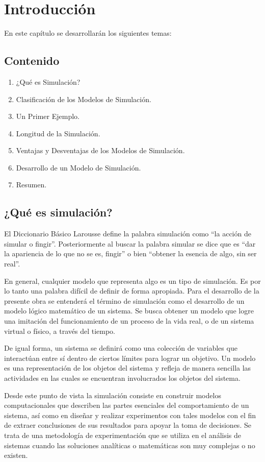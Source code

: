 \chapter{Introducción}

En este capítulo se desarrollarán los siguientes temas:
\section*{Contenido}
\begin{enumerate}
\item ¿Qué es Simulación?
\item Clasificación de los Modelos de Simulación.
\item Un Primer Ejemplo.
\item Longitud de la Simulación.
\item Ventajas y Desventajas de los Modelos de Simulación.
\item Desarrollo de un Modelo de Simulación.
\item Resumen.
\end{enumerate}


\section{¿Qué es simulación?}

El Diccionario Básico Larousse define la palabra simulación como ``la acción de simular o fingir''. Posteriormente al buscar la palabra simular se dice que es ``dar la apariencia de lo que no se es, fingir'' o bien ``obtener la esencia de algo, sin ser real''.

En general, cualquier modelo que representa algo es un tipo de simulación. Es por lo tanto una palabra difícil de definir de forma apropiada. Para el desarrollo de la presente obra se entenderá el término de simulación como el desarrollo de un modelo lógico matemático de un sistema. Se busca obtener un modelo que logre una imitación del funcionamiento de un proceso de la vida real, o de un sistema virtual o físico, a través del tiempo.

De igual forma, un sistema se definirá como una colección de variables que interactúan entre sí dentro de ciertos límites para lograr un objetivo. Un modelo es una representación de los objetos del sistema y refleja de manera sencilla las actividades en las cuales se encuentran involucrados los objetos del sistema.

Desde este punto de vista la simulación consiste en construir modelos computacionales que describen las partes esenciales del comportamiento de un sistema, así como en diseñar y realizar experimentos con tales modelos con el fin de extraer conclusiones de sus resultados para apoyar la toma de decisiones. Se trata de una metodología de experimentación que se utiliza en el análisis de sistemas cuando las soluciones analíticas o matemáticas son muy complejas o no existen.




